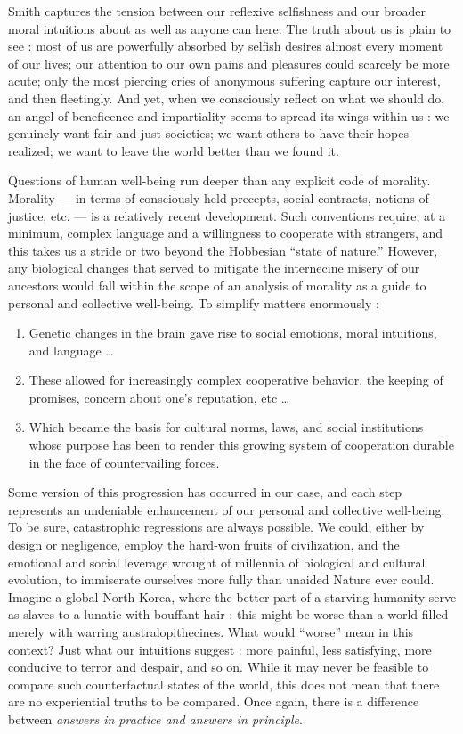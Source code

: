 \documentclass[a4paper,14pt]{extarticle}
\begin{document}
Smith captures the tension between our reflexive selfishness and our broader moral intuitions about as well as anyone can here.
The truth about us is plain to see :
most of us are powerfully absorbed by selfish desires almost every moment of our lives;
our attention to our own pains and pleasures could scarcely be more acute;
only the most piercing cries of anonymous suffering capture our interest, and then fleetingly.
And yet, when we consciously reflect on what we should do, an angel of beneficence and impartiality seems to spread its wings within us :
we genuinely want fair and just societies;
we want others to have their hopes realized;
we want to leave the world better than we found it.

Questions of human well-being run deeper than any explicit code of morality.
Morality --- in terms of consciously held precepts, social contracts, notions of justice, etc. --- is a relatively recent development.
Such conventions require, at a minimum, complex language and a willingness to cooperate with strangers, and this takes us a stride or two beyond the Hobbesian ``state of nature.''
However, any biological changes that served to mitigate the internecine misery of our ancestors would fall within the scope of an analysis of morality as a guide to personal and collective well-being.
To simplify matters enormously :

\begin{enumerate}
      \item Genetic changes in the brain gave rise to social emotions, moral intuitions, and language \dots
      \item These allowed for increasingly complex cooperative behavior, the keeping of promises, concern about one's reputation, etc \dots
      \item Which became the basis for cultural norms, laws, and social institutions whose purpose has been to render this growing system of cooperation durable in the face of countervailing forces.
\end{enumerate}

Some version of this progression has occurred in our case, and each step represents an undeniable enhancement of our personal and collective well-being.
To be sure, catastrophic regressions are always possible.
We could, either by design or negligence, employ the hard-won fruits of civilization, and the emotional and social leverage wrought of millennia of biological and cultural evolution, to immiserate ourselves more fully than unaided Nature ever could.
Imagine a global North Korea, where the better part of a starving humanity serve as slaves to a lunatic with bouffant hair :
this might be worse than a world filled merely with warring australopithecines.
What would ``worse'' mean in this context?
Just what our intuitions suggest :
more painful, less satisfying, more conducive to terror and despair, and so on.
While it may never be feasible to compare such counterfactual states of the world, this does not mean that there are no experiential truths to be compared.
Once again, there is a difference between \textit{answers in practice and answers in principle}.
\end{document}
